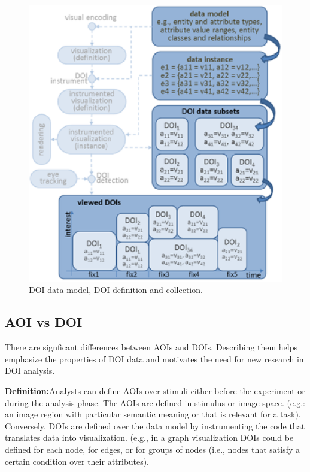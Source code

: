\begin{figure}[!htb]
  \centering
  \includegraphics[width=\linewidth]{images/DOIDataModel.eps}
  \caption{DOI data model, DOI definition and collection. }
	\label{fig:dataModel}
\end{figure}



\subsection{AOI vs DOI}
\label{sec:AOIvDOI}
There are signficant differences between AOIs and DOIs. Describing them helps emphasize the properties of DOI data and motivates the need for new research in DOI analysis.

\textbf{\underline{Definition:}}Analysts can define AOIs over stimuli either before the experiment or during the analysis phase. The AOIs are defined in stimulus or image space. (e.g.: an image region with particular semantic meaning or that is relevant for a task). Conversely, DOIs are defined over the data model by instrumenting the code that translates data into visualization.   (e.g., in a graph visualization DOIs could be defined for each node, for edges, or for groups of nodes (i.e., nodes that satisfy a certain condition over their attributes).

